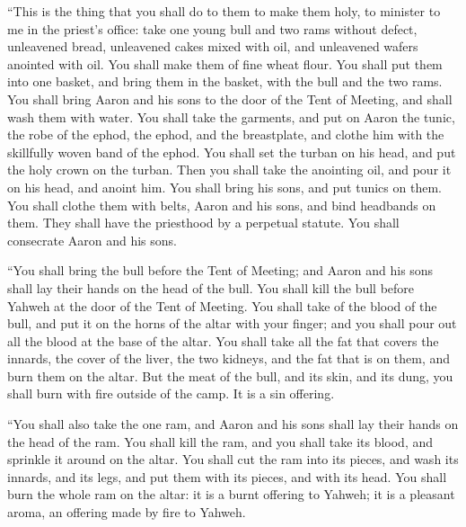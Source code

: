  ``This is the thing that you shall do to them to make them
holy, to minister to me in the priest's office: take one young bull and
two rams without defect,  unleavened bread, unleavened cakes
mixed with oil, and unleavened wafers anointed with oil. You shall make
them of fine wheat flour.  You shall put them into one
basket, and bring them in the basket, with the bull and the two rams.
 You shall bring Aaron and his sons to the door of the Tent
of Meeting, and shall wash them with water.  You shall take
the garments, and put on Aaron the tunic, the robe of the ephod, the
ephod, and the breastplate, and clothe him with the skillfully woven
band of the ephod.  You shall set the turban on his head,
and put the holy crown on the turban.  Then you shall take
the anointing oil, and pour it on his head, and anoint him. 
You shall bring his sons, and put tunics on them.  You shall
clothe them with belts, Aaron and his sons, and bind headbands on them.
They shall have the priesthood by a perpetual statute. You shall
consecrate Aaron and his sons.

 ``You shall bring the bull before the Tent of Meeting; and
Aaron and his sons shall lay their hands on the head of the bull.
 You shall kill the bull before Yahweh at the door of the
Tent of Meeting.  You shall take of the blood of the bull,
and put it on the horns of the altar with your finger; and you shall
pour out all the blood at the base of the altar.  You shall
take all the fat that covers the innards, the cover of the liver, the
two kidneys, and the fat that is on them, and burn them on the altar.
 But the meat of the bull, and its skin, and its dung, you
shall burn with fire outside of the camp. It is a sin offering.

 ``You shall also take the one ram, and Aaron and his sons
shall lay their hands on the head of the ram.  You shall
kill the ram, and you shall take its blood, and sprinkle it around on
the altar.  You shall cut the ram into its pieces, and wash
its innards, and its legs, and put them with its pieces, and with its
head.  You shall burn the whole ram on the altar: it is a
burnt offering to Yahweh; it is a pleasant aroma, an offering made by
fire to Yahweh.

